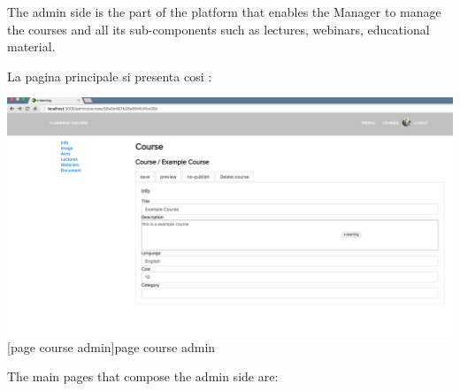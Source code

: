 The admin side is the part of the platform that enables the Manager to manage the courses and all its sub-components such as lectures, webinars, educational material.

La pagina principale si presenta cosi :

\begin{minipage}{\linewidth}
    \centering
    \includegraphics[width=1.0\linewidth]{images/chapter4/page-course-admin.png}
    [page course admin]{page course admin}
\end{minipage}


The main pages that compose the admin side are:

